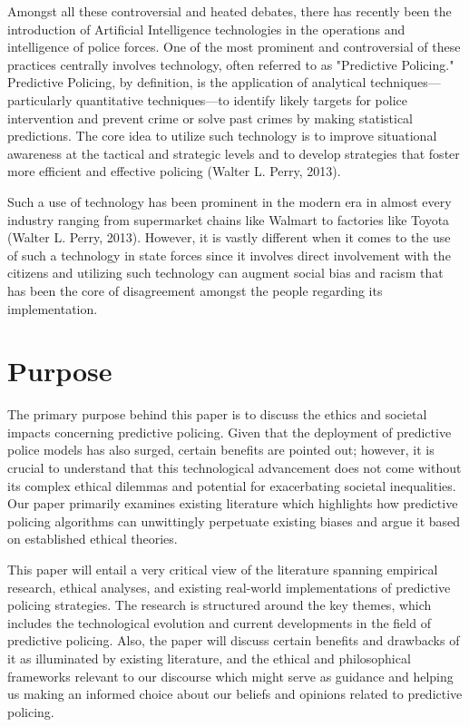 \documentclass[man, noextraspace]{apa7} %
\begin{document}
Amongst all these controversial and heated debates, there has recently been the 
introduction of Artificial Intelligence technologies in the operations and intelligence of police 
forces. One of the most prominent and controversial of these practices centrally involves 
technology, often referred to as "Predictive Policing." Predictive Policing, by definition, is the 
application of analytical techniques—particularly quantitative techniques—to identify likely 
targets for police intervention and prevent crime or solve past crimes by making statistical 
predictions. The core idea to utilize such technology is to improve situational awareness at the 
tactical and strategic levels and to develop strategies that foster more efficient and effective 
policing (Walter L. Perry, 2013).

Such a use of technology has been prominent in the modern era in almost every industry 
ranging from supermarket chains like Walmart to factories like Toyota (Walter L. Perry, 2013). 
However, it is vastly different when it comes to the use of such a technology in state forces since 
it involves direct involvement with the citizens and utilizing such technology can augment social 
bias and racism that has been the core of disagreement amongst the people regarding its
implementation. \vspace{1cm}

\section{Purpose}
The primary purpose behind this paper is to discuss the ethics and societal impacts concerning predictive policing. Given that the 
deployment of predictive police models has also surged, certain benefits are pointed out; however, it is crucial to understand that this technological 
advancement does not come without its complex ethical dilemmas and potential for 
exacerbating societal inequalities. Our paper primarily examines existing literature which 
highlights how predictive policing algorithms can unwittingly perpetuate existing biases and 
argue it based on established ethical theories.

This paper will entail a very critical view of the literature spanning empirical research, ethical 
analyses, and existing real-world implementations of predictive policing strategies. The research 
is structured around the key themes, which includes the technological evolution and current 
developments in the field of predictive policing. Also, the paper will discuss certain benefits and drawbacks of it as 
illuminated by existing literature, and the ethical and philosophical frameworks relevant to our discourse which might serve as guidance and helping us making an informed choice about our beliefs and opinions related to predictive policing. \vspace{1cm}
\end{document}
